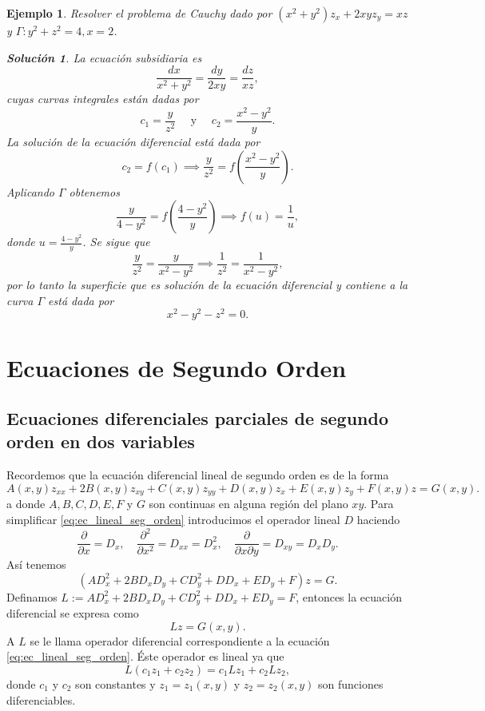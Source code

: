 \documentclass[11pt,letterpaper,draft]{report}
\newtheorem{example}[defn]{Ejemplo}
\newtheorem*{sol}{Solución}
\newcommand\<{\langle}
\renewcommand\>{\rangle}
\begin{document}
\begin{example}
  Resolver el problema de Cauchy dado por $(x^2+y^2) z_x +
  2xy z_y = xz$ y $\Gamma : y^2 + z^2 = 4, x = 2$.
  \begin{sol}
    La ecuación subsidiaria es
    \[
    \frac{dx}{x^2+y^2} = \frac{dy}{2xy} = \frac{dz}{xz},
    \] 
    cuyas curvas integrales están dadas por
    \[
    c_1 = \frac{y}{z^2} \quad \text{ y } \quad c_2 =
    \frac{x^2-y^2}{y}.
    \] 
    La solución de la ecuación diferencial está dada por
    \[
    c_2 = f(c_1) \implies \frac{y}{z^2} =
    f\left(\frac{x^2-y^2}{y}\right).
    \] 
    Aplicando $\Gamma$ obtenemos
    \[
    \frac{y}{4-y^2} = f\left(\frac{4-y^2}{y}\right) \implies
    f(u) = \frac{1}{u},
    \] 
    donde $u = \frac{4-y^2}{y}$. Se sigue que
    \[
    \frac{y}{z^2} = \frac{y}{x^2-y^2} \implies \frac{1}{z^2}
    = \frac{1}{x^2-y^2},
    \] 
    por lo tanto la superficie que es solución de la
    ecuación diferencial y contiene a la curva $\Gamma$ está
    dada por
    \[
    x^2 - y^2 - z^2 = 0.
    \] 
  \end{sol}
\end{example}

\chapter{Ecuaciones de Segundo Orden}

\section{Ecuaciones diferenciales parciales de segundo orden
  en dos variables}

Recordemos que la ecuación diferencial lineal de segundo
orden es de la forma
\begin{equation}
  \label{eq:ec_lineal_seg_orden}
  A(x,y) z_{xx} + 2B(x,y)z_{xy} + C(x,y) z_{yy} + D(x,y) z_x
  + E(x,y) z_y + F(x,y) z = G(x,y).
\end{equation}a
donde $A,B,C,D,E,F$ y $G$ son continuas en alguna región del
plano $xy$. Para simplificar \ref{eq:ec_lineal_seg_orden}
introducimos el operador lineal $D$ haciendo
\[
\frac{\partial}{\partial x} = D_x, \quad
\frac{\partial^2}{\partial x^2} = D_{xx} = D_x^2, \quad
\frac{\partial}{\partial x \partial y} = D_{xy} = D_x D_y.
\] 
Así tenemos
\[
  (AD_x^2 + 2BD_xD_y + CD_y^2 + DD_x + ED_y + F)z = G.
\] 
Definamos $L := AD_x^2 + 2BD_xD_y + CD_y^2 + D D_x + ED_y =
F$, entonces la ecuación diferencial se expresa como
\begin{equation}
  \label{eq:ec_expr_diferencial}
  Lz = G(x,y).
\end{equation}
A $L$ se le llama operador diferencial correspondiente a la
ecuación \ref{eq:ec_lineal_seg_orden}. Éste operador es
lineal ya que
\[
L(c_1z_1 + c_2z_2) = c_1 Lz_1 + c_2 Lz_2,
\] 
donde $c_1$ y $c_2$ son constantes y $z_1 = z_1(x,y)$ y
$z_2 = z_2(x,y)$ son funciones diferenciables.
\end{document}

